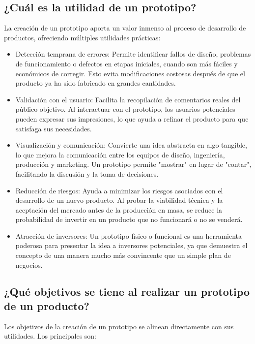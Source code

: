 \subsection*{¿Cuál es la utilidad de un prototipo?}
\noindent La creación de un prototipo aporta un valor inmenso al
proceso de desarrollo de productos, ofreciendo múltiples utilidades prácticas:

\begin{itemize}
  \item Detección temprana de errores: Permite identificar fallos de
    diseño, problemas de funcionamiento o defectos en etapas
    iniciales, cuando son más fáciles y económicos de corregir. Esto
    evita modificaciones costosas después de que el producto ya ha
    sido fabricado en grandes cantidades.

  \item Validación con el usuario: Facilita la recopilación de
    comentarios reales del público objetivo. Al interactuar con el
    prototipo, los usuarios potenciales pueden expresar sus
    impresiones, lo que ayuda a refinar el producto para que
    satisfaga sus necesidades.

  \item Visualización y comunicación: Convierte una idea abstracta en
    algo tangible, lo que mejora la comunicación entre los equipos de
    diseño, ingeniería, producción y marketing. Un prototipo permite
    "mostrar" en lugar de "contar", facilitando la discusión y la
    toma de decisiones.

  \item Reducción de riesgos: Ayuda a minimizar los riesgos asociados
    con el desarrollo de un nuevo producto. Al probar la viabilidad
    técnica y la aceptación del mercado antes de la producción en
    masa, se reduce la probabilidad de invertir en un producto que no
    funcionará o no se venderá.

  \item Atracción de inversores: Un prototipo físico o funcional es
    una herramienta poderosa para presentar la idea a inversores
    potenciales, ya que demuestra el concepto de una manera mucho más
    convincente que un simple plan de negocios.
\end{itemize}

\subsection*{¿Qué objetivos se tiene al realizar un prototipo de un producto?}
\noindent Los objetivos de la creación de un prototipo se alinean
directamente con sus utilidades. Los principales son:


